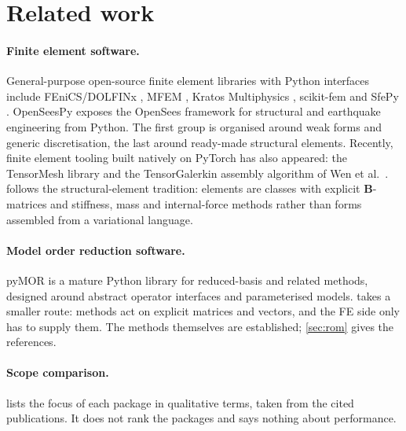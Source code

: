 \section{Related work}\label{sec:related}

\paragraph{Finite element software.}
General-purpose open-source finite element libraries with Python interfaces include FEniCS/DOLFINx \cite{logg2012fenics,baratta2023dolfinx},
MFEM \cite{anderson2021mfem}, Kratos Multiphysics \cite{dadvand2010kratos}, scikit-fem \cite{gustafsson2020skfem} and SfePy \cite{cimrman2019sfepy}.
OpenSeesPy \cite{zhu2018openseespy} exposes the OpenSees framework for structural and earthquake engineering from Python.
The first group is organised around weak forms and generic discretisation, the last around ready-made structural elements.
Recently, finite element tooling built natively on PyTorch has also appeared: the TensorMesh library \cite{tensormesh2026} and the TensorGalerkin assembly algorithm of Wen et al.\ \cite{wen2026tensorgalerkin}.
\fea{} follows the structural-element tradition: elements are classes with explicit $\bm B$-matrices and stiffness, mass and internal-force
methods rather than forms assembled from a variational language.

\paragraph{Model order reduction software.}
pyMOR \cite{milk2016pymor} is a mature Python library for reduced-basis and related methods, designed around abstract operator
interfaces and parameterised models. \rom{} takes a smaller route: methods act on explicit matrices and vectors, and the
FE side only has to supply them. The methods themselves are established; \cref{sec:rom} gives the references.

\paragraph{Scope comparison.}
 lists the focus of each package in qualitative terms, taken from the cited publications. It does not rank the packages
and says nothing about performance.

